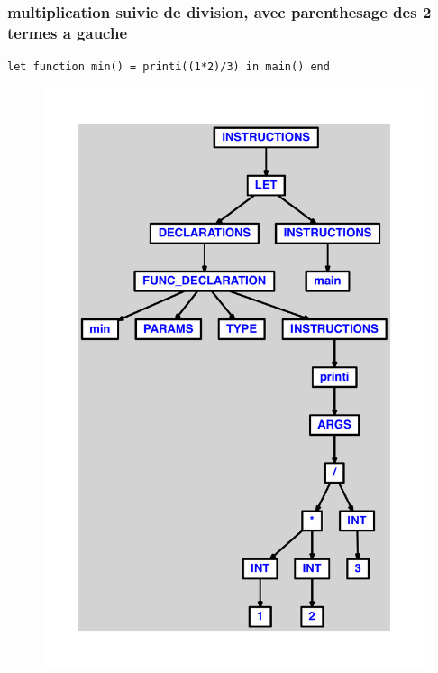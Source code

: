 \documentclass{article}
\begin{document}
\subsubsection{multiplication suivie de division, avec parenthesage des 2 termes a gauche}
\begin{lstlisting}
let function min() = printi((1*2)/3) in main() end
\end{lstlisting}
\newpage
\begin{figure}[H]
\centering
\includegraphics[max width=\textwidth]{ast/ast_102.pdf}
\end{figure}
\newpage
\end{document}

